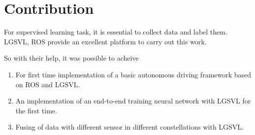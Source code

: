 \section{Contribution}
For supervised learning task, it is essential to collect data and label them. LGSVL, ROS provide an excellent platform to carry out this work. 

So with their help, it was possible to acheive 
\begin{enumerate}
    \item For first time implementation of a basic autonomous driving framework based on ROS and LGSVL.
    \item An implementation of an end-to-end training neural network with LGSVL for the first time.
    \item Fusing of data with different sensor in different constellations with LGSVL. 
\end{enumerate}
  


